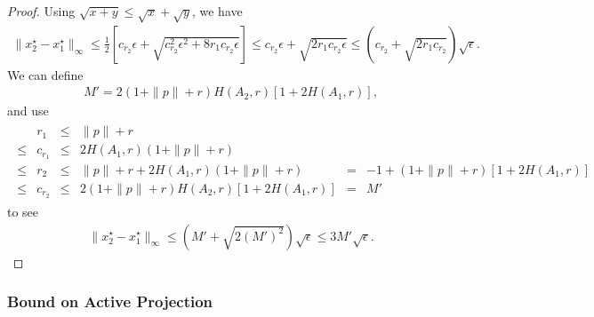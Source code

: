 \documentclass{article}
\newcounter{criteriacounter}
\newenvironment{criteria}[1][]{\refstepcounter{criteriacounter}\par\medskip
\textbf{Criteria \thecriteriacounter} \rmfamily \itshape}{\medskip}
\newtheorem{definition}[theorem]{Definition}
\newtheorem{lemma}[theorem]{Lemma}
\theoremstyle{case}
\numberwithin{theorem}{subsection}
\newcommand{\dk}{\Delta_k}
\newcommand{\naturals}{\mathbb N}
\newcommand{\xk}{x^{(k)}}
\newcommand{\xl}{{x^{(l)}}}
\begin{document}
\begin{proof}
Using $\sqrt{x + y} \le \sqrt{x} + \sqrt{y}$, we have
\begin{align*}
\|x_2^{\star} - x_1^{\star}\|_{\infty} \le \frac 1 2 \left[c_{r_2}\epsilon + \sqrt{c_{r_2}^2\epsilon^2 + 8r_1c_{r_2}\epsilon}\right] 
\le c_{r_2}\epsilon + \sqrt{2r_1c_{r_2}\epsilon}
\le \left(c_{r_2} + \sqrt{2r_1c_{r_2}}\right)\sqrt{\epsilon}.
\end{align*}
We can define 
\begin{align*}
M' = 2 \left(1 + \|p\| + r\right) H\left(A_2, r\right) \left[1 + 2H(A_1, r)\right],
\end{align*}
and use
\begin{align*}
\begin{array}{cccccl}
& r_1     &\le& \|p\| + r 													& &	\\
\le & c_{r_1} &\le& 2H\left(A_1, r\right)\left(1 + \|p\| + r\right) 				& &	\\
\le & r_2     &\le&  \|p\| + r + 2H\left(A_1, r\right)\left(1 + \|p\| + r\right) 	&=&-1 + \left(1 + \|p\| + r\right)\left[1 + 2H(A_1, r)\right]\\
\le & c_{r_2} &\le& 2 \left(1 + \|p\| + r\right) H\left(A_2, r\right) \left[1 + 2H(A_1, r)\right] &=& M'
\end{array}
\end{align*}
to see
\begin{align*}
\|x_2^{\star} - x_1^{\star}\|_{\infty} \le \left(M' + \sqrt{2\left(M'\right)^2}\right)\sqrt{\epsilon} \le 3M'\sqrt{\epsilon}.
\end{align*}

\end{proof}




\subsubsection{Bound on Active Projection}




% 
\end{document}
